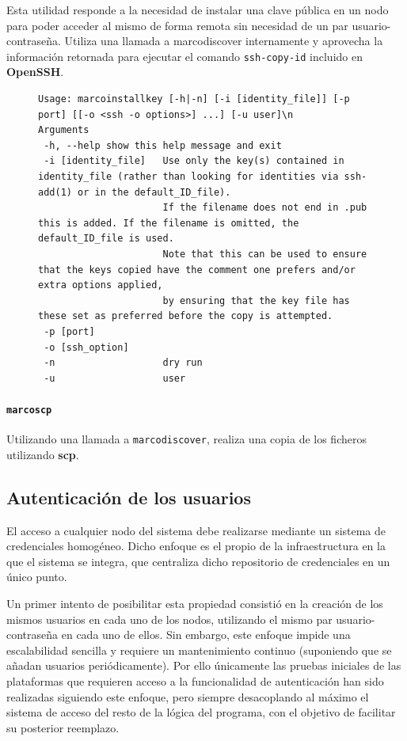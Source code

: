 Esta utilidad responde a la necesidad de instalar una clave pública en un nodo para poder acceder al mismo de forma remota sin necesidad de un par usuario-contraseña. Utiliza una llamada a marcodiscover internamente y aprovecha la información retornada para ejecutar el comando \texttt{ssh-copy-id} incluido en \textbf{OpenSSH}.

\begin{figure}[H]
\begin{lstlisting}
Usage: marcoinstallkey [-h|-n] [-i [identity_file]] [-p port] [[-o <ssh -o options>] ...] [-u user]\n
Arguments
 -h, --help	show this help message and exit
 -i [identity_file]   Use only the key(s) contained in identity_file (rather than looking for identities via ssh-add(1) or in the default_ID_file).
                      If the filename does not end in .pub this is added. If the filename is omitted, the default_ID_file is used.
                      Note that this can be used to ensure that the keys copied have the comment one prefers and/or extra options applied,
                      by ensuring that the key file has these set as preferred before the copy is attempted.
 -p [port]
 -o [ssh_option]
 -n                   dry run
 -u                   user

\end{lstlisting}
\end{figure}

\paragraph{\texttt{marcoscp}\\}

Utilizando una llamada a \texttt{marcodiscover}, realiza una copia de los ficheros utilizando \textbf{scp}.


\subsection{Autenticación de los usuarios}

El acceso a cualquier nodo del sistema debe realizarse mediante un sistema de credenciales homogéneo. Dicho enfoque es el propio de la infraestructura en la que el sistema se integra, que centraliza dicho repositorio de credenciales en un único punto.

Un primer intento de posibilitar esta propiedad consistió en la creación de los mismos usuarios en cada uno de los nodos, utilizando el mismo par usuario-contraseña en cada uno de ellos. Sin embargo, este enfoque impide una escalabilidad sencilla y requiere un mantenimiento continuo (suponiendo que se añadan usuarios periódicamente). Por ello únicamente las pruebas iniciales de las plataformas que requieren acceso a la funcionalidad de autenticación han sido realizadas siguiendo este enfoque, pero siempre desacoplando al máximo el sistema de acceso del resto de la lógica del programa, con el objetivo de facilitar su posterior reemplazo.

